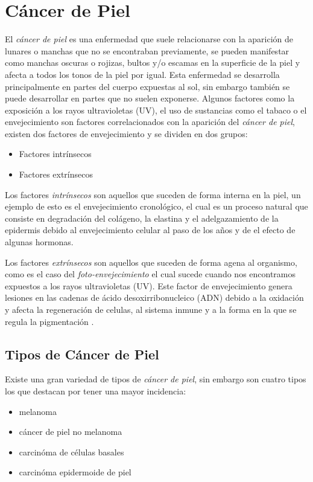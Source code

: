 \section{Cáncer de Piel}
El \emph{cáncer de piel} es una enfermedad que suele relacionarse con la aparición de lunares o manchas que no se encontraban previamente, se pueden manifestar como manchas oscuras o rojizas, bultos y/o escamas en la superficie de la piel y afecta a todos los tonos de la piel por igual. Esta enfermedad se desarrolla principalmente en partes del cuerpo expuestas al sol, sin embargo también se puede desarrollar en partes que no suelen exponerse. Algunos factores como la exposición a los rayos ultravioletas (UV), el uso de sustancias como el tabaco o el envejecimiento son factores correlacionados con la aparición del \emph{cáncer de piel}, existen dos factores de envejecimiento y se dividen en dos grupos: 

\begin{itemize}
    \item Factores intrínsecos 
    \item Factores extrínsecos 
\end{itemize}

Los factores \emph{intrínsecos} son aquellos que suceden de forma interna en la piel, un ejemplo de esto es el envejecimiento cronológico, el cual es un proceso natural que consiste en degradación del colágeno, la elastina y el adelgazamiento de la epidermis debido al envejecimiento celular al paso de los años y de el efecto de algunas hormonas.

Los factores \emph{extrínsecos} son aquellos que suceden de forma agena al organismo, como es el caso del \emph{foto-envejecimiento} el cual sucede cuando nos encontramos expuestos a los rayos ultravioletas (UV). Este factor de envejecimiento genera lesiones en las cadenas de ácido desoxirribonucleico (ADN) debido a la oxidación y afecta la regeneración de celulas, al sistema inmune y a la forma en la que se regula la pigmentación \citep{skin_aging}.

\subsection{Tipos de Cáncer de Piel}
Existe una gran variedad de tipos de \emph{cáncer de piel}, sin embargo son cuatro tipos los que destacan por tener una mayor incidencia:

\begin{itemize}
    \item melanoma
    \item cáncer de piel no melanoma
    \item carcinóma de células basales
    \item carcinóma epidermoide de piel
\end{itemize}

